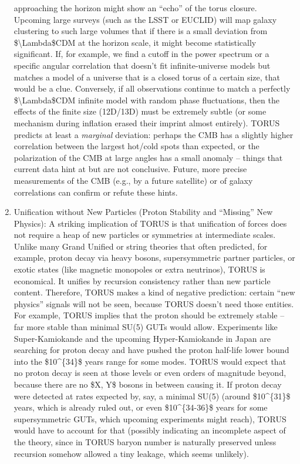 \documentclass[]{article}
\begin{document}
\begin{enumerate}
  approaching the horizon might show an ``echo'' of the torus closure.
  Upcoming large surveys (such as the LSST or EUCLID) will map galaxy
  clustering to such large volumes that if there is a small deviation
  from \$\textbackslash{}Lambda\$CDM at the horizon scale, it might
  become statistically significant. If, for example, we find a cutoff in
  the power spectrum or a specific angular correlation that doesn't fit
  infinite-universe models but matches a model of a universe that is a
  closed torus of a certain size, that would be a clue. Conversely, if
  all observations continue to match a perfectly
  \$\textbackslash{}Lambda\$CDM infinite model with random phase
  fluctuations, then the effects of the finite size (12D/13D) must be
  extremely subtle (or some mechanism during inflation erased their
  imprint almost entirely). TORUS predicts at least a \emph{marginal}
  deviation: perhaps the CMB has a slightly higher correlation between
  the largest hot/cold spots than expected, or the polarization of the
  CMB at large angles has a small anomaly -- things that current data
  hint at but are not conclusive. Future, more precise measurements of
  the CMB (e.g., by a future satellite) or of galaxy correlations can
  confirm or refute these hints.
\item
  Unification without New Particles (Proton Stability and ``Missing''
  New Physics): A striking implication of TORUS is that unification of
  forces does not require a heap of new particles or symmetries at
  intermediate scales. Unlike many Grand Unified or string theories that
  often predicted, for example, proton decay via heavy bosons,
  supersymmetric partner particles, or exotic states (like magnetic
  monopoles or extra neutrinos), TORUS is economical. It unifies by
  recursion consistency rather than new particle content. Therefore,
  TORUS makes a kind of negative prediction: certain ``new physics''
  signals will not be seen, because TORUS doesn't need those entities.
  For example, TORUS implies that the proton should be extremely stable
  -- far more stable than minimal SU(5) GUTs would allow. Experiments
  like Super-Kamiokande and the upcoming Hyper-Kamiokande in Japan are
  searching for proton decay and have pushed the proton half-life lower
  bound into the \$10\^{}\{34\}\$ years range for some modes. TORUS
  would expect that no proton decay is seen at those levels or even
  orders of magnitude beyond, because there are no \$X, Y\$ bosons in
  between causing it. If proton decay were detected at rates expected
  by, say, a minimal SU(5) (around \$10\^{}\{31\}\$ years, which is
  already ruled out, or even \$10\^{}\{34-36\}\$ years for some
  supersymmetric GUTs, which upcoming experiments might reach), TORUS
  would have to account for that (possibly indicating an incomplete
  aspect of the theory, since in TORUS baryon number is naturally
  preserved unless recursion somehow allowed a tiny leakage, which seems
  unlikely).
\end{enumerate}
\end{document}
